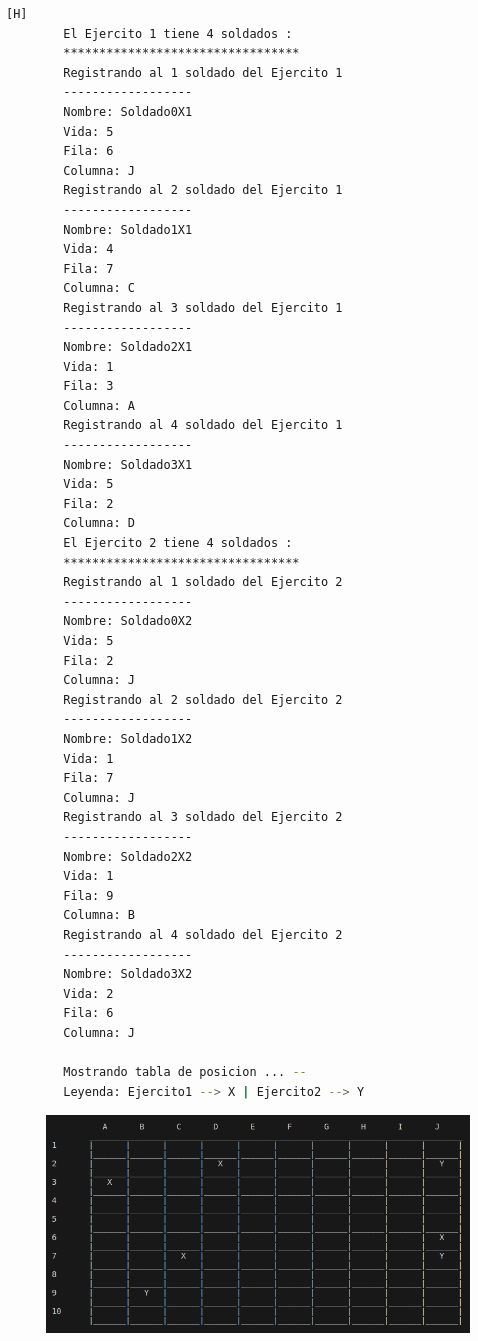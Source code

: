 \documentclass{article}
\begin{document}
	\begin{lstlisting}[language=bash,caption={Ejecucion:}][H]
		El Ejercito 1 tiene 4 soldados : 
		*********************************
		Registrando al 1 soldado del Ejercito 1
		------------------
		Nombre: Soldado0X1
		Vida: 5
		Fila: 6
		Columna: J
		Registrando al 2 soldado del Ejercito 1
		------------------
		Nombre: Soldado1X1
		Vida: 4
		Fila: 7
		Columna: C
		Registrando al 3 soldado del Ejercito 1
		------------------
		Nombre: Soldado2X1
		Vida: 1
		Fila: 3
		Columna: A
		Registrando al 4 soldado del Ejercito 1
		------------------
		Nombre: Soldado3X1
		Vida: 5
		Fila: 2
		Columna: D
		El Ejercito 2 tiene 4 soldados : 
		*********************************
		Registrando al 1 soldado del Ejercito 2
		------------------
		Nombre: Soldado0X2
		Vida: 5
		Fila: 2
		Columna: J
		Registrando al 2 soldado del Ejercito 2
		------------------
		Nombre: Soldado1X2
		Vida: 1
		Fila: 7
		Columna: J
		Registrando al 3 soldado del Ejercito 2
		------------------
		Nombre: Soldado2X2
		Vida: 1
		Fila: 9
		Columna: B
		Registrando al 4 soldado del Ejercito 2
		------------------
		Nombre: Soldado3X2
		Vida: 2
		Fila: 6
		Columna: J
		
		Mostrando tabla de posicion ... --
		Leyenda: Ejercito1 --> X | Ejercito2 --> Y

	\end{lstlisting}
	\begin{figure}[H]
		\centering
		\includegraphics[width=1.0\textwidth,keepaspectratio]{img/Commit4.png}
	\end{figure}
\end{document}
